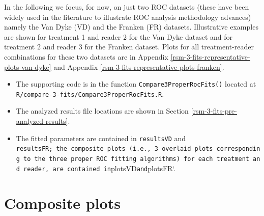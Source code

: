 \documentclass[
]{book}
\newenvironment{Shaded}{\begin{snugshade}}{\end{snugshade}}
\newcommand{\CommentTok}[1]{\textcolor[rgb]{0.56,0.35,0.01}{\textit{#1}}}
\newcommand{\KeywordTok}[1]{\textcolor[rgb]{0.13,0.29,0.53}{\textbf{#1}}}
\newcommand{\NormalTok}[1]{#1}
\newcommand{\OperatorTok}[1]{\textcolor[rgb]{0.81,0.36,0.00}{\textbf{#1}}}
\newcommand{\StringTok}[1]{\textcolor[rgb]{0.31,0.60,0.02}{#1}}
\providecommand{\tightlist}{%
  \setlength{\itemsep}{0pt}\setlength{\parskip}{0pt}}
\begin{document}
In the following we focus, for now, on just two ROC datasets (these have been widely used in the literature to illustrate ROC analysis methodology advances) namely the Van Dyke (VD) and the Franken (FR) datasets. Illustrative examples are shown for treatment 1 and reader 2 for the Van Dyke dataset and for treatment 2 and reader 3 for the Franken dataset. Plots for all treatment-reader combinations for these two datasets are in Appendix \ref{rsm-3-fits-representative-plots-van-dyke} and Appendix \ref{rsm-3-fits-representative-plots-franken}.

\begin{Shaded}
\end{Shaded}

\begin{itemize}
\tightlist
\item
  The supporting code is in the function \texttt{Compare3ProperRocFits()} located at \texttt{R/compare-3-fits/Compare3ProperRocFits.R}.
\item
  The analyzed results file locations are shown in Section \ref{rsm-3-fits-pre-analyzed-results}.
\item
  The fitted parameters are contained in \texttt{resultsVD} and \texttt{resultsFR;\ the\ composite\ plots\ (i.e.,\ 3\ overlaid\ plots\ corresponding\ to\ the\ three\ proper\ ROC\ fitting\ algorithms)\ for\ each\ treatment\ and\ reader,\ are\ contained\ in}plotsVD\texttt{and}plotsFR`.
\end{itemize}

\hypertarget{rsm-3-fits-composite-plots}{%
\section{Composite plots}\label{rsm-3-fits-composite-plots}}
\end{document}

